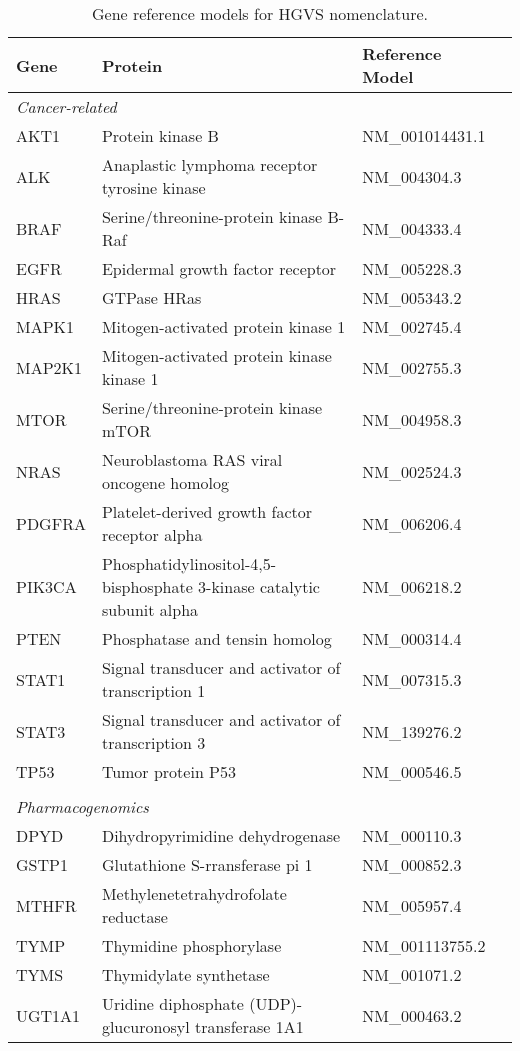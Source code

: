 \normalsize
\begin{table}[H]
    \caption{Gene reference models for HGVS nomenclature.}
    \label{tbl:genemodel}
    \centering
    \begin{tabular}{llll}
    \hline
    Gene & Protein & Reference Model \\
    \hline
    \multicolumn{3}{l}{\textit{Cancer-related}}
    \\
    AKT1 & Protein kinase B & NM\_001014431.1 \\
    ALK & Anaplastic lymphoma receptor tyrosine kinase & NM\_004304.3 \\
    BRAF & Serine/threonine-protein kinase B-Raf & NM\_004333.4 \\
    EGFR & Epidermal growth factor receptor & NM\_005228.3 \\
    HRAS & GTPase HRas & NM\_005343.2 \\
    MAPK1 & Mitogen-activated protein kinase 1 & NM\_002745.4 \\
    MAP2K1 & Mitogen-activated protein kinase kinase 1 & NM\_002755.3 \\
    MTOR & Serine/threonine-protein kinase mTOR & NM\_004958.3 \\
    NRAS & Neuroblastoma RAS viral oncogene homolog & NM\_002524.3 \\
    PDGFRA & Platelet-derived growth factor receptor alpha & NM\_006206.4 \\
    PIK3CA & Phosphatidylinositol-4,5-bisphosphate 3-kinase catalytic subunit alpha & NM\_006218.2 \\
    PTEN & Phosphatase and tensin homolog & NM\_000314.4 \\
    STAT1 & Signal transducer and activator of transcription 1 & NM\_007315.3 \\
    STAT3 & Signal transducer and activator of transcription 3 & NM\_139276.2 \\
    TP53 & Tumor protein P53 & NM\_000546.5 \\
    \\
    \multicolumn{3}{l}{\textit{Pharmacogenomics}}
    \\
    DPYD & Dihydropyrimidine dehydrogenase & NM\_000110.3 \\
    GSTP1 & Glutathione S-rransferase pi 1 & NM\_000852.3 \\
    MTHFR & Methylenetetrahydrofolate reductase & NM\_005957.4 \\
    TYMP & Thymidine phosphorylase & NM\_001113755.2 \\
    TYMS & Thymidylate synthetase & NM\_001071.2 \\
    UGT1A1 & Uridine diphosphate (UDP)-glucuronosyl transferase 1A1 & NM\_000463.2\\
    \hline
    \end{tabular}
\end{table}


